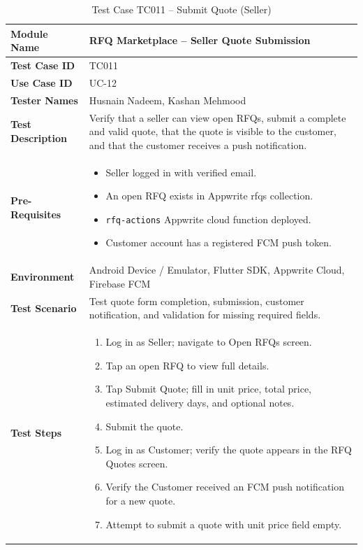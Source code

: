 \begin{table}[H]
\centering
\caption{Test Case TC011 -- Submit Quote (Seller)}
\label{tab:tc011}
\renewcommand{\arraystretch}{1.15}
\small
\begin{tabular}{|p{3.2cm}|p{10.8cm}|}
\hline
\textbf{Module Name} & RFQ Marketplace -- Seller Quote Submission \\ \hline
\textbf{Test Case ID} & TC011 \\ \hline
\textbf{Use Case ID} & UC-12 \\ \hline
\textbf{Tester Names} & Husnain Nadeem, Kashan Mehmood \\ \hline
\textbf{Test Description} & Verify that a seller can view open RFQs, submit a complete and valid quote, that the quote is visible to the customer, and that the customer receives a push notification. \\ \hline
\textbf{Pre-Requisites} &
\begin{itemize}[leftmargin=*,noitemsep]
\item Seller logged in with verified email.
\item An open RFQ exists in Appwrite rfqs collection.
\item \texttt{rfq-actions} Appwrite cloud function deployed.
\item Customer account has a registered FCM push token.
\end{itemize} \\ \hline
\textbf{Environment} & Android Device / Emulator, Flutter SDK, Appwrite Cloud, Firebase FCM \\ \hline
\textbf{Test Scenario} & Test quote form completion, submission, customer notification, and validation for missing required fields. \\ \hline
\textbf{Test Steps} &
\begin{enumerate}[leftmargin=*,noitemsep]
\item Log in as Seller; navigate to Open RFQs screen.
\item Tap an open RFQ to view full details.
\item Tap Submit Quote; fill in unit price, total price, estimated delivery days, and optional notes.
\item Submit the quote.
\item Log in as Customer; verify the quote appears in the RFQ Quotes screen.
\item Verify the Customer received an FCM push notification for a new quote.
\item Attempt to submit a quote with unit price field empty.

\end{enumerate}
\end{tabular}
\end{table}
